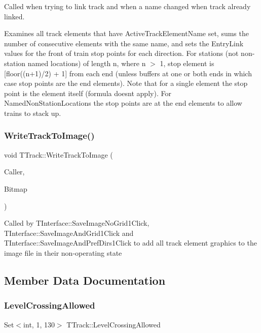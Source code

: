 Called when trying to link track and when a name changed when track already linked.

Examines all track elements that have Active\+Track\+Element\+Name set, sums the number of consecutive elements with the same name, and sets the Entry\+Link values for the front of train stop points for each direction. For stations (not non-\/station named locations) of length n, where n $>$ 1, stop element is \mbox{[}floor((n+1)/2) + 1\mbox{]} from each end (unless buffers at one or both ends in which case stop points are the end elements). Note that for a single element the stop point is the element itself (formula doesn\textquotesingle{}t apply). For Named\+Non\+Station\+Locations the stop points are at the end elements to allow trains to stack up. \mbox{\label{class_t_track_ab3530b4af2a4b2a9cd1c1b480a19298d}} 
\subsubsection{\texorpdfstring{Write\+Track\+To\+Image()}{WriteTrackToImage()}}
{\footnotesize\ttfamily void T\+Track\+::\+Write\+Track\+To\+Image (\begin{DoxyParamCaption}\item[{int}]{Caller,  }\item[{Graphics\+::\+T\+Bitmap $\ast$}]{Bitmap }\end{DoxyParamCaption})}

Called by T\+Interface\+::\+Save\+Image\+No\+Grid1\+Click, T\+Interface\+::\+Save\+Image\+And\+Grid1\+Click and T\+Interface\+::\+Save\+Image\+And\+Pref\+Dirs1\+Click to add all track element graphics to the image file in their non-\/operating state 

\subsection{Member Data Documentation}
\mbox{\label{class_t_track_a29617e6f88e44a7974dc08a371682d0b}} 
\subsubsection{\texorpdfstring{Level\+Crossing\+Allowed}{LevelCrossingAllowed}}
{\footnotesize\ttfamily Set$<$int, 1, 130$>$ T\+Track\+::\+Level\+Crossing\+Allowed\hspace{0.3cm}{\ttfamily [private]}}

